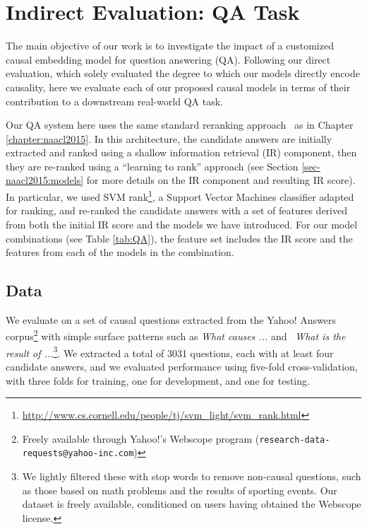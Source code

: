 \section{Indirect Evaluation: QA Task}
\label{sec-emnlp2016:indirecteval}

The main objective of our work is to investigate the impact of a customized causal embedding model for question answering (QA). Following our direct evaluation, which solely evaluated the degree to which our models directly encode causality, here we evaluate each of our proposed causal models in terms of their contribution to a downstream real-world QA task.

Our QA system here uses the same standard reranking approach~\citep{jansen14} as in Chapter \ref{chapter:naacl2015}.
In this architecture, the candidate answers are initially extracted and ranked using a shallow information retrieval (IR) component, then they are re-ranked using a ``learning to rank'' approach (see Section \ref{sec-naacl2015:models} for more details on the IR component and resulting IR score).
In particular, we used SVM rank\footnote{ \url{http://www.cs.cornell.edu/people/tj/svm_light/svm_rank.html}}, a Support Vector Machines classifier adapted for ranking, and re-ranked the candidate answers with a set of features derived from both the initial IR score and the models we have introduced. For our model combinations (see Table \ref{tab:QA}), the feature set includes the IR score and the features from each of the models in the combination.
%

\subsection{Data}

We evaluate on a set of causal questions extracted from the Yahoo! Answers corpus\footnote{Freely available through Yahoo!'s Webscope
program ({\scriptsize {\tt research-data-requests@yahoo-inc.com}})} with simple surface patterns such as \emph{What causes ...} and ~\emph{What is the result of ...}\footnote{We lightly filtered these with stop words to remove non-causal questions, such as those based on math problems and the results of sporting events. Our dataset is freely available, conditioned on users having obtained the Webscope license.}.
We extracted a total of 3031 questions, each with at least four candidate answers, and we evaluated performance using five-fold cross-validation, with three folds for training, one for development, and one for testing. 


